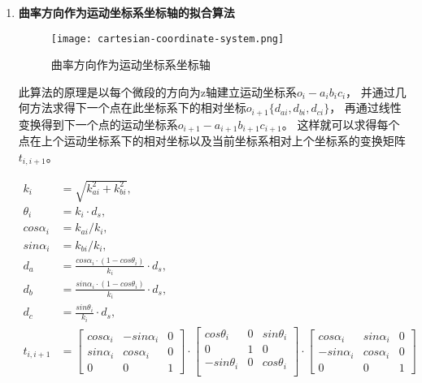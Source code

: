 \begin{enumerate}[label=(\Alph*)]
    \item \textbf{曲率方向作为运动坐标系坐标轴的拟合算法} \\

    \begin{figure}
    \centering
    \texttt{[image: cartesian-coordinate-system.png]}
    \caption{曲率方向作为运动坐标系坐标轴}
    \end{figure}

    此算法的原理是以每个微段的方向为z轴建立运动坐标系$o_i-a_ib_ic_i$，
    并通过几何方法求得下一个点在此坐标系下的相对坐标\cite{3d-shape-display}$o_{i+1} \{d_{ai}, d_{bi}, d_{ci}\}$，
    再通过线性变换得到下一个点的运动坐标系\cite{three-dimensional-curve}$o_{i+1}-a_{i+1}b_{i+1} c_{i+1}$。
    这样就可以求得每个点在上个运动坐标系下的相对坐标以及当前坐标系相对上个坐标系的变换矩阵$t_{i, i+1}$。

    \begin{align}
        k_i &= \sqrt{k_{ai} ^ 2 + k_{bi} ^ 2}, \\
        \theta_i &= k_i \cdot d_s, \\
        cos\alpha_i &= k_{ai} / k_i, \\
        sin\alpha_i &= k_{bi} / k_i, \\
        d_a &= \frac{cos\alpha_i \cdot (1 - cos\theta_i)}{k_i} \cdot d_s, \\
        d_b &= \frac{sin\alpha_i \cdot (1 - cos\theta_i)}{k_i} \cdot d_s, \\
        d_c &= \frac{sin\theta_i}{k_i} \cdot d_s, \\
        t_{i, i+1} &= \left[
            \begin{matrix}
                cos \alpha_i & -sin \alpha_i & 0 \\
                sin \alpha_i & cos \alpha_i & 0 \\
                0 & 0 & 1
            \end{matrix}
            \right]
            \cdot
            \left[
            \begin{matrix}
                cos \theta_i & 0 & sin \theta_i \\
                0 & 1 & 0 \\
                -sin \theta_i & 0 & cos \theta_i \\
            \end{matrix}
            \right]
            \cdot
            \left[
            \begin{matrix}
                cos \alpha_i & sin \alpha_i & 0 \\
                -sin \alpha_i & cos \alpha_i & 0 \\
                0 & 0 & 1
            \end{matrix}
            \right] \label{alg:reconstruction}
    \end{align}


\end{enumerate}
